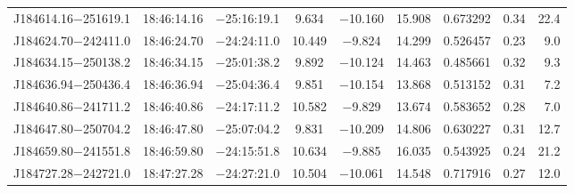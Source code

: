 \begin{table*}
\begin{tabular}{lcccccccr}
J184614.16$-$251619.1 & 18:46:14.16 & $-$25:16:19.1 &  9.634 & $-$10.160 & 15.908 & 0.673292 & 0.34 & 22.4 \\
J184624.70$-$242411.0 & 18:46:24.70 & $-$24:24:11.0 & 10.449 & $-$9.824 & 14.299 & 0.526457 & 0.23 & 9.0 \\
J184634.15$-$250138.2 & 18:46:34.15 & $-$25:01:38.2 &  9.892 & $-$10.124 & 14.463 & 0.485661 & 0.32 & 9.3 \\
J184636.94$-$250436.4 & 18:46:36.94 & $-$25:04:36.4 &  9.851 & $-$10.154 & 13.868 & 0.513152 & 0.31 & 7.2 \\
J184640.86$-$241711.2 & 18:46:40.86 & $-$24:17:11.2 & 10.582 & $-$9.829 & 13.674 & 0.583652 & 0.28 & 7.0 \\
J184647.80$-$250704.2 & 18:46:47.80 & $-$25:07:04.2 &  9.831 & $-$10.209 & 14.806 & 0.630227 & 0.31 & 12.7 \\
J184659.80$-$241551.8 & 18:46:59.80 & $-$24:15:51.8 & 10.634 & $-$9.885 & 16.035 & 0.543925 & 0.24 & 21.2 \\
J184727.28$-$242721.0 & 18:47:27.28 & $-$24:27:21.0 & 10.504 & $-$10.061 & 14.548 & 0.717916 & 0.27 & 12.0 \\
\hline                                                                                                       
\end{tabular}                                                                                                
\end{table*}                                                                                                 

